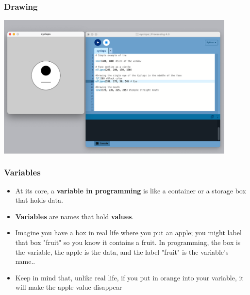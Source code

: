 \documentclass[10pt]{beamer}
\begin{document}

\begin{frame}
  \frametitle{Drawing}
   \includegraphics[width=0.9\textwidth]{images/drawing_01}
  
  \end{frame}


\begin{frame}
  \frametitle{Variables}
  \begin{itemize}
   \item{At its core, a \textbf{variable in programming} is like a container or a storage box that holds data.}
   \item{\textbf{Variables} are names that hold \textbf{values}.}
    \item{Imagine you have a box in real life where you put an apple; you might label that box "fruit" so you know it contains a fruit. In programming, the box is the variable, the apple is the data, and the label "fruit" is the variable's name..}
      \item{Keep in mind that, unlike real life, if you put in orange into your variable, it will make the apple value disappear}
 \end{itemize}
\end{frame}

\end{document}
